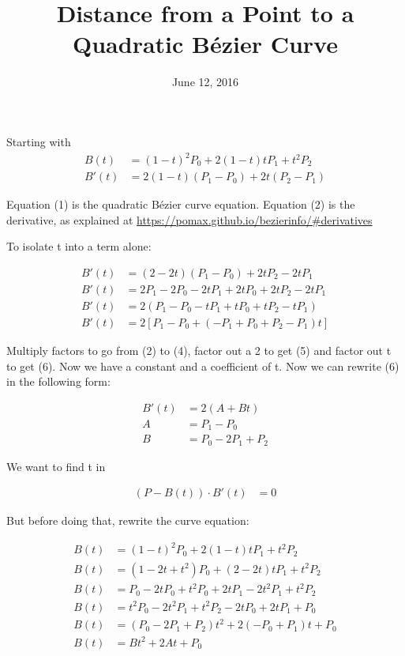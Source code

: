\documentclass{article}
\begin{document}
\title{Distance from a Point to a Quadratic B\'ezier Curve}
\date{June 12, 2016}
\maketitle

Starting with 
\begin{align}
B(t) &= (1-t)^2 P_0 + 2(1-t)t P_1 + t^2 P_2 \\
B'(t) &= 2(1-t)(P_1 - P_0) + 2t(P_2 - P_1)
\end{align}

Equation (1) is the quadratic B\'ezier curve equation. Equation (2) is the derivative, as explained at \url{https://pomax.github.io/bezierinfo/#derivatives}

To isolate t into a term alone:

\begin{align}
B'(t) &= (2-2t)(P_1 - P_0) + 2t P_2 - 2t P_1 \\
B'(t) &= 2 P_1 - 2 P_0 - 2t P_1 + 2t P_0 + 2t P_2 - 2t P_1 \\
B'(t) &= 2 (P_1 - P_0 - t P_1 + t P_0 + t P_2 - t P_1) \\
B'(t) &= 2 [P_1 - P_0 + ( - P_1 + P_0 + P_2 - P_1)t]
\end{align}

Multiply factors to go from (2) to (4), factor out a 2 to get (5) and factor out t to get (6). Now we have a constant and a coefficient of t. Now we can rewrite (6) in the following form:

\begin{align}
B'(t) &= 2(A+Bt) \\
A &= P_1 - P_0 \nonumber \\
B &= P_0 - 2 P_1 + P_2 \nonumber
\end{align}

We want to find t in

\begin{align}
(P - B(t)) \cdot B'(t) &= 0
\end{align}

But before doing that, rewrite the curve equation:

\begin{align}
B(t) &= (1-t)^2 P_0 + 2(1-t)t P_1 + t^2 P_2 \\
B(t) &= (1 - 2t + t^2) P_0 + (2-2t) t P_1 + t^2 P_2 \\
B(t) &= P_0 - 2t P_0 + t^2 P_0 + 2t P_1 - 2t^2 P_1 + t^2 P_2 \\
B(t) &= t^2 P_0 - 2t^2 P_1 + t^2 P_2 - 2t P_0 + 2t P_1 + P_0 \\
B(t) &= (P_0 - 2 P_1 + P_2) t^2 + 2(-P_0 + P_1) t + P_0 \\
B(t) &= B t^2 + 2 A t + P_0
\end{align}
\end{document}
